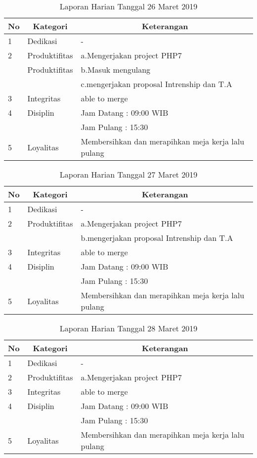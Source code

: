 \begin{table}[htp]
\caption{Laporan Harian Tanggal 26 Maret 2019}
\label{tab:lh260319}
\begin{tabular}{|l|l|l|}
\hline
\textbf{No} & \multicolumn{1}{c|}{\textbf{Kategori}} & \multicolumn{1}{c|}{\textbf{Keterangan}} \\ \hline
1 & Dedikasi & - \\ \hline
2 & Produktifitas & a.Mengerjakan project PHP7 \\
   & Produktifitas & b.Masuk mengulang \\
   & & c.mengerjakan proposal Intrenship dan T.A \\ \hline
3 & Integritas & able to merge \\ \hline
4 & Disiplin & Jam Datang : 09:00 WIB \\
   &  & Jam Pulang : 15:30 \\ \hline
5 & Loyalitas & Membersihkan dan merapihkan meja kerja lalu pulang \\ \hline
\end{tabular}
\end{table}

\begin{table}[htp]
\caption{Laporan Harian Tanggal 27 Maret 2019}
\label{tab:lh270319}
\begin{tabular}{|l|l|l|}
\hline
\textbf{No} & \multicolumn{1}{c|}{\textbf{Kategori}} & \multicolumn{1}{c|}{\textbf{Keterangan}} \\ \hline
1 & Dedikasi & - \\ \hline
2 & Produktifitas & a.Mengerjakan project PHP7 \\
   & & b.mengerjakan proposal Intrenship dan T.A \\ \hline
3 & Integritas & able to merge \\ \hline
4 & Disiplin & Jam Datang : 09:00 WIB \\
   &  & Jam Pulang : 15:30 \\ \hline
5 & Loyalitas & Membersihkan dan merapihkan meja kerja lalu pulang \\ \hline
\end{tabular}
\end{table}

\begin{table}[htp]
\caption{Laporan Harian Tanggal 28 Maret 2019}
\label{tab:lh280319}
\begin{tabular}{|l|l|l|}
\hline
\textbf{No} & \multicolumn{1}{c|}{\textbf{Kategori}} & \multicolumn{1}{c|}{\textbf{Keterangan}} \\ \hline
1 & Dedikasi & - \\ \hline
2 & Produktifitas & a.Mengerjakan project PHP7 \\
3 & Integritas & able to merge \\ \hline
4 & Disiplin & Jam Datang : 09:00 WIB \\
   &  & Jam Pulang : 15:30 \\ \hline
5 & Loyalitas & Membersihkan dan merapihkan meja kerja lalu pulang \\ \hline
\end{tabular}
\end{table}

